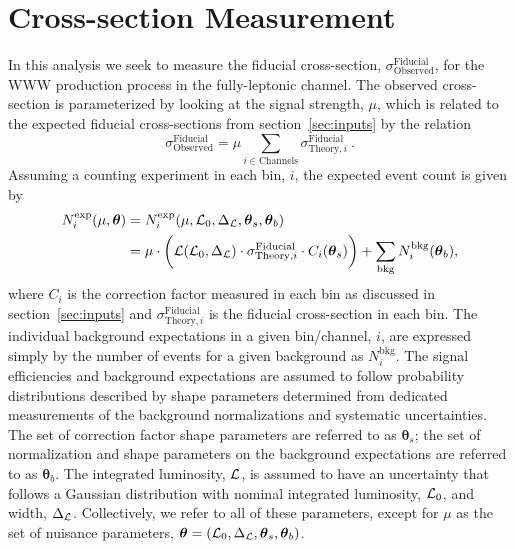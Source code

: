 

\section{Cross-section Measurement}
\label{sec:measurement}
\newcommand*\Diff[1]{\mathop{}\!\mathrm{d}#1~}
\newcommand{\boldtheta}{\boldsymbol{\theta}}
\newcommand{\thetas}{\boldsymbol{\theta}_s}
\newcommand{\thetab}{\boldsymbol{\theta}_b}

In this analysis we seek to measure the 
fiducial cross-section, $\sigma^{\textrm{Fiducial}}_{\textrm{Observed}}$, for the 
WWW production process in the fully-leptonic channel.
The observed cross-section is parameterized by looking at the signal
strength, $\mu$, which is related to the expected fiducial cross-sections
from section~\ref{sec:inputs} by the relation
\begin{equation}
\sigma^{\textrm{Fiducial}}_{\textrm{Observed}} = \mu \sum_{i\in \textrm{Channels}} \sigma^{\textrm{Fiducial}}_{\textrm{Theory},i}~.
\end{equation}
Assuming a counting experiment in each bin, $i$, the expected 
event count is given by
\begin{align}
N^{\mathrm{exp}}_i(\mu,\boldtheta) &= N^{\mathrm{exp}}_i(\mu,\curlyl_0,\Delta_{\curlyl},\thetas,\thetab) \\
 &= \mu \cdot \bigg( \curlyl(\curlyl_0,\Delta_{\curlyl}) \cdot \sigma^{\mathrm{Fiducial}}_{\textrm{Theory},i} \cdot C_i(\thetas) \bigg) + \sum_{\mathrm{bkg}} N_{i}^{\mathrm{bkg}}(\thetab),
\label{eq:poisson_expectation}
\end{align}
where $C_i$ is the correction factor 
measured in each bin as discussed in section~\ref{sec:inputs} and 
$\sigma^{\mathrm{Fiducial}}_{\mathrm{Theory},i}$ is the fiducial cross-section in each 
bin. The 
individual background expectations in a given bin/channel, $i$, are 
expressed simply by the number of events
for a given background as $N^{\mathrm{bkg}}_i$. 
The signal efficiencies and background expectations are assumed to follow 
probability distributions described by shape parameters determined from 
dedicated measurements of the background normalizations and systematic 
uncertainties.  
The set of correction factor shape parameters are referred to 
as $\thetas$; the set of normalization and shape parameters on 
the background expectations are referred to as $\thetab$.
The integrated luminosity, $\mathcal{L}$, is assumed to have an uncertainty
that follows 
a Gaussian distribution with nominal integrated 
luminosity, $\mathcal{L}_0$, and width, $\Delta_{\mathcal{L}}$. 
Collectively, we refer to all of these parameters, except 
for $\mu$ as the set of nuisance 
parameters, $\boldtheta = (\curlyl_0,\Delta_{\curlyl}, \thetas, \thetab)$. 

